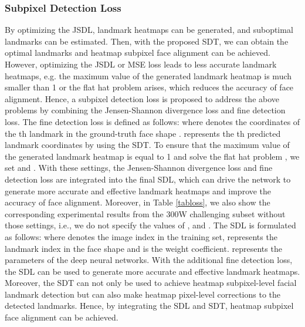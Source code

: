 \documentclass[journal]{IEEEtran}
\begin{document}
\subsubsection{Subpixel Detection Loss}
\indent By optimizing the JSDL, landmark heatmaps can be generated, and suboptimal landmarks can be estimated. Then, with the proposed SDT, we can obtain the optimal landmarks and heatmap subpixel face alignment can be achieved. However, optimizing the JSDL or MSE loss leads to less accurate landmark heatmaps, e.g. the maximum value of the generated landmark heatmap is much smaller than 1 or the flat hat problem \cite{Liu2019SemanticAF} arises, which reduces the accuracy of face alignment. Hence, a subpixel detection loss is proposed to address the above problems by combining the Jensen-Shannon divergence loss and fine detection loss. The fine detection loss is defined as follows:
where  denotes the coordinates of the  th landmark in the ground-truth face shape .  represents the  th predicted landmark coordinates by using the SDT. To ensure that the maximum value of the generated landmark heatmap is equal to 1 and solve the flat hat problem \cite{Liu2019SemanticAF}, we set  and . With these settings, the Jensen-Shannon divergence loss and fine detection loss are integrated into the final SDL, which can drive the network to generate more accurate and effective landmark heatmaps and improve the accuracy of face alignment. Moreover, in Table \ref{tabloss}, we also show the corresponding experimental results from the 300W challenging subset without those settings, i.e., we do not specify the values of ,  and . The SDL is formulated as follows:
where  denotes the image index in the training set,  represents the landmark index in the face shape and  is the weight coefficient.  represents the parameters of the deep neural networks. With the additional fine detection loss, the SDL can be used to generate more accurate and effective landmark heatmaps. Moreover, the SDT can not only be used to achieve heatmap subpixel-level facial landmark detection but can also make heatmap pixel-level corrections to the detected landmarks. Hence, by integrating the SDL and SDT, heatmap subpixel face alignment can be achieved.
\end{document}
